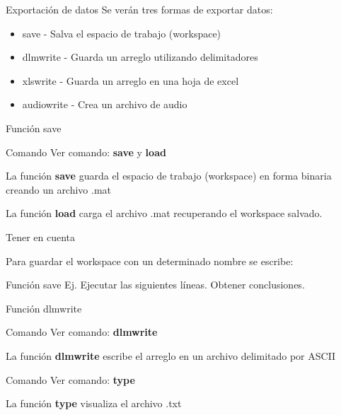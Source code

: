 \documentclass{bredelebeamer}
\begin{document}
\begin{frame}{Exportación de datos}
Se verán tres formas de exportar datos:\\
\begin{itemize}
\item  save - Salva el espacio de trabajo (workspace)
\item  dlmwrite - Guarda un arreglo utilizando delimitadores
\item  xlswrite - Guarda un arreglo en una hoja de excel
\item  audiowrite - Crea un archivo de audio
\end{itemize}
\end{frame}

\begin{frame}{Función save}
\begin{exampleblock}{Comando}
Ver comando: \textbf{save} y \textbf{load}
\end{exampleblock}
La función \textbf{save} guarda el espacio de trabajo (workspace) en forma binaria creando un archivo .mat

La función \textbf{load} carga el archivo .mat recuperando el workspace salvado.
\begin{block}{Tener en cuenta}
\begin{center}
Para guardar el workspace con un determinado nombre se escribe:\\
\begin{center}

\end{center}
\end{center}
\end{block}
\end{frame}

\begin{frame}{Función save}
Ej. Ejecutar las siguientes líneas. Obtener conclusiones.
\begin{center}

\end{center}

\end{frame}

\begin{frame}{Función dlmwrite}
\begin{exampleblock}{Comando}
Ver comando: \textbf{dlmwrite}
\end{exampleblock}
La función \textbf{dlmwrite} escribe el arreglo en un archivo delimitado por ASCII
\begin{exampleblock}{Comando}
Ver comando: \textbf{type}
\end{exampleblock}
La función \textbf{type} visualiza el archivo .txt
\end{frame}
\end{document}
